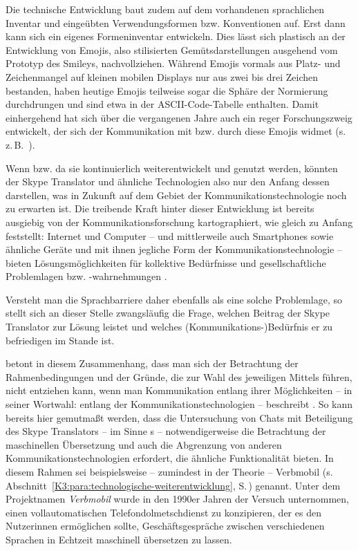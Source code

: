 Die technische Entwicklung baut zudem auf dem \glqq vorhandenen sprachlichen Inventar und eingeübten Verwendungsformen bzw. Konventionen\grqq{} \citep[1142]{brinker_voraussetzungen_2001} auf. Erst dann kann sich \glqq ein eigenes Formeninventar\grqq{} \citep[1142]{brinker_voraussetzungen_2001} entwickeln. Dies lässt sich plastisch an der Entwicklung von Emojis, also stilisierten Gemütsdarstellungen ausgehend vom Prototyp des Smileys, nachvollziehen. Während Emojis vormals aus Platz- und Zeichenmangel auf kleinen mobilen Displays nur aus zwei bis drei Zeichen bestanden, haben heutige Emojis teilweise sogar die Sphäre der Normierung durchdrungen und sind etwa in der ASCII-Code-Tabelle enthalten. Damit einhergehend hat sich über die vergangenen Jahre auch ein reger Forschungszweig entwickelt, der sich der Kommunikation mit bzw. durch diese Emojis widmet (s. z.\,B.\ \cite{beiswenger_zu_2017}).

Wenn bzw. da sie kontinuierlich weiterentwickelt und genutzt werden, könnten der Skype Translator und ähnliche Technologien also nur den Anfang dessen darstellen, was in Zukunft auf dem Gebiet der Kommunikationstechnologie noch zu erwarten ist. Die treibende Kraft hinter dieser Entwicklung ist bereits ausgiebig von der Kommunikationsforschung kartographiert, wie \citeauthor{beck_computervermittelte_2006} gleich zu Anfang feststellt: Internet und Computer -- und mittlerweile auch Smartphones sowie ähnliche Geräte und mit ihnen jegliche Form der Kommunikationstechnologie -- bieten Lösungsmöglichkeiten für \glqq kollektive Bedürfnisse und gesellschaftliche Problemlagen bzw. -wahrnehmungen\grqq{} \citep[1]{beck_computervermittelte_2006}.

Versteht man die Sprachbarriere daher ebenfalls als eine solche Problemlage, so stellt sich an dieser Stelle zwangsläufig die Frage, welchen Beitrag der Skype Translator zur Lösung leistet und welches (Kommunikations-)Bedürfnis er zu befriedigen im Stande ist.

\citeauthor{beiswenger_sprachhandlungskoordination_2007} betont in diesem Zusammenhang, dass man sich der Betrachtung der Rahmenbedingungen und der Gründe, die zur Wahl des jeweiligen Mittels führen, nicht entziehen kann, wenn man Kommunikation entlang ihrer Möglichkeiten -- in seiner Wortwahl: entlang der Kommunikationstechnologien -- beschreibt \citep[13]{beiswenger_sprachhandlungskoordination_2007}. So kann bereits hier gemutmaßt werden, dass die Untersuchung von Chats mit Beteiligung des Skype Translators -- im Sinne \citeauthor{beiswenger_sprachhandlungskoordination_2007}s -- notwendigerweise die Betrachtung der maschinellen Übersetzung und auch die Abgrenzung von anderen Kommunikationstechnologien erfordert, die ähnliche Funktionalität bieten. In diesem Rahmen sei beispielsweise – zumindest in der Theorie – Verbmobil (s. Abschnitt~\ref{K3:para:technologische-weiterentwicklung}, S.\,\pageref{K3:para:technologische-weiterentwicklung}) genannt. Unter dem Projektnamen \emph{Verbmobil} \citep[]{wahlster_verbmobil_2000} wurde in den 1990er Jahren der Versuch unternommen, einen vollautomatischen Telefondolmetschdienst zu konzipieren, der es den Nutzer{\textperiodcentered}innen ermöglichen sollte, Geschäftsgespräche zwischen verschiedenen Sprachen in Echtzeit maschinell übersetzen zu lassen.

